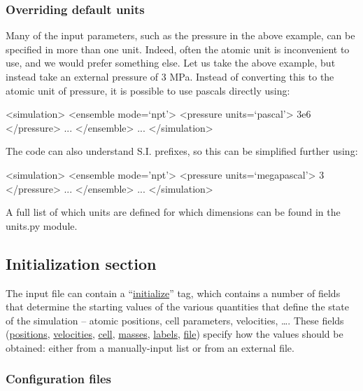 \documentclass[11pt,english,fleqn]{report}
\newenvironment{code}{%
\footnotesize 
\verbatim
}{
\endverbatim
\normalsize
}
\begin{document}
\subsubsection{Overriding default units}

\label{inputunits}

Many of the input parameters, such as the pressure in the above example,
can be specified in more than one unit. Indeed, often the atomic unit
is inconvenient to use, and we would prefer something else. Let us
take the above example, but instead take an external pressure of 3
MPa. Instead of converting this to the atomic unit of pressure, it
is possible to use pascals directly using:

\begin{code}
<simulation>
   <ensemble mode=`npt'>
      <pressure units=`pascal'> 3e6 </pressure>
      ...
   </ensemble>
   ...
</simulation>
\end{code}

The code can also understand S.I. prefixes, so this can be simplified
further using:

\begin{code}
<simulation>
   <ensemble mode='npt'>
      <pressure units=`megapascal'> 3 </pressure>
      ...
   </ensemble>
   ...
</simulation>
\end{code}

A full list of which units are defined for which dimensions
can be found in the units.py module.


\subsection{Initialization section}

The input file can contain a {}``\hyperref[INITIALIZER]{initialize}'' tag, which
contains a number of fields that determine the starting values of the various
quantities that define the state of the simulation -- atomic positions, cell parameters, velocities, \ldots.
These fields (\hyperref[INITPOSITIONS]{positions},  \hyperref[INITVELOCITIES]{velocities},  
\hyperref[INITCELL]{cell},  \hyperref[INITMASSES]{masses},  \hyperref[INITLABELS]{labels},
\hyperref[INITFILE]{file}) specify how the values should be obtained: 
either from a manually-input list or from an external file.   

\subsubsection{Configuration files}
\end{document}
